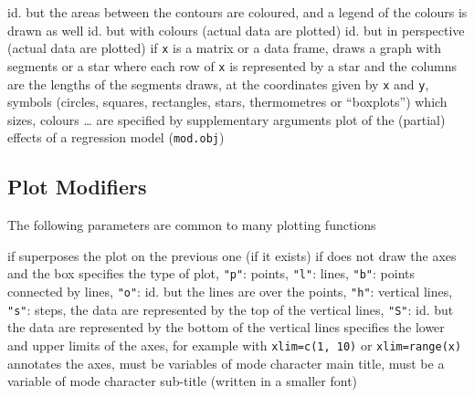 	{ id. but the areas between the contours are
coloured, and a legend of the colours is drawn as well}
	{ id. but with colours (actual data are plotted)}
	{ id. but in perspective (actual data are plotted)}
	{if {\tt x} is a matrix or a data frame, draws a graph with
segments or a star where each row of {\tt x} is represented by a star and the
columns are the lengths of the segments}
	{draws, at the coordinates given by {\tt x} and
{\tt y}, symbols (circles, squares, rectangles, stars, thermometres or
``boxplots'') which sizes, colours \ldots{} are specified by supplementary
arguments}
	{ plot of the (partial) effects of a regression
model ({\tt mod.obj})}

\subsection{Plot Modifiers}{The following parameters are common to many
    plotting functions}

	{if \T superposes the plot on the previous one (if it exists)}
	{if \F does not draw the axes and the box}
	{ specifies the type of plot, {\tt "p"}: points, {\tt "l"}:
lines, {\tt "b"}: points connected by lines, {\tt "o"}: id. but the lines are
over the points, {\tt "h"}: vertical lines, {\tt "s"}: steps, the data are
represented by the top of the vertical lines, {\tt "S"}: id. but the data are
represented by the bottom of the vertical lines}
	{specifies the lower and upper limits of the axes, for
example with {\tt xlim=c(1, 10)} or {\tt xlim=range(x)}}
	{ annotates the axes, must be variables of mode character}
	{ main title, must be a variable of mode character}
	{ sub-title (written in a smaller font)}

